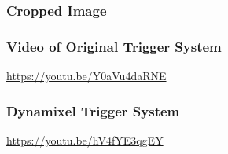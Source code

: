 \documentclass[11pt, hidelinks]{report}
\begin{document}
\subsubsection{Cropped Image} \label{app:crop}
	\begin{center}
	\end{center}
	
\subsubsection{Video of Original Trigger System} \label{app:ogtrig}
	\begin{center}
	    \url{https://youtu.be/Y0aVu4daRNE}
	\end{center}

\subsubsection{Dynamixel Trigger System} \label{app:dyntrig}
	\begin{center}
	    \url{https://youtu.be/hV4fYE3qgEY}
	\end{center}
\end{document}
